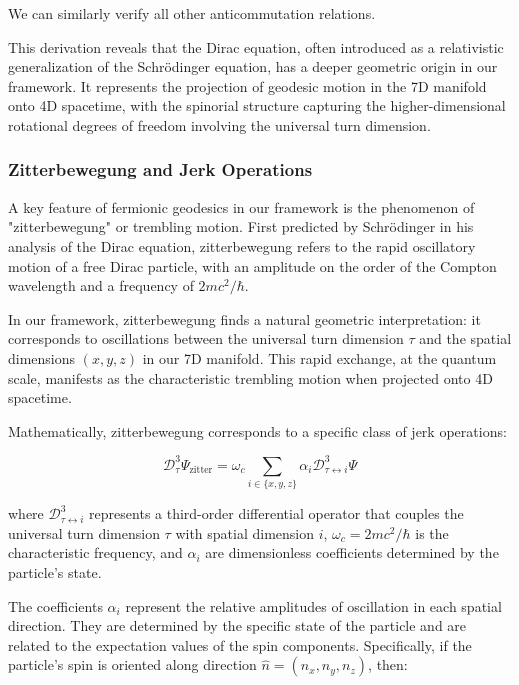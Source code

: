 \documentclass{article}
\begin{document}
We can similarly verify all other anticommutation relations.

This derivation reveals that the Dirac equation, often introduced as a relativistic generalization of the Schrödinger equation, has a deeper geometric origin in our framework. It represents the projection of geodesic motion in the 7D manifold onto 4D spacetime, with the spinorial structure capturing the higher-dimensional rotational degrees of freedom involving the universal turn dimension.

\subsubsection{Zitterbewegung and Jerk Operations}

A key feature of fermionic geodesics in our framework is the phenomenon of "zitterbewegung" or trembling motion. First predicted by Schrödinger in his analysis of the Dirac equation, zitterbewegung refers to the rapid oscillatory motion of a free Dirac particle, with an amplitude on the order of the Compton wavelength and a frequency of $2mc^2/\hbar$.

In our framework, zitterbewegung finds a natural geometric interpretation: it corresponds to oscillations between the universal turn dimension $\tau$ and the spatial dimensions $(x,y,z)$ in our 7D manifold. This rapid exchange, at the quantum scale, manifests as the characteristic trembling motion when projected onto 4D spacetime.

Mathematically, zitterbewegung corresponds to a specific class of jerk operations:

\begin{equation}
\mathcal{D}_\tau^3 \Psi_{\text{zitter}} = \omega_c \sum_{i \in \{x,y,z\}} \alpha_i \mathcal{D}_{\tau \leftrightarrow i}^3 \Psi
\end{equation}

where $\mathcal{D}_{\tau \leftrightarrow i}^3$ represents a third-order differential operator that couples the universal turn dimension $\tau$ with spatial dimension $i$, $\omega_c = 2mc^2/\hbar$ is the characteristic frequency, and $\alpha_i$ are dimensionless coefficients determined by the particle's state.

The coefficients $\alpha_i$ represent the relative amplitudes of oscillation in each spatial direction. They are determined by the specific state of the particle and are related to the expectation values of the spin components. Specifically, if the particle's spin is oriented along direction $\hat{n} = (n_x, n_y, n_z)$, then:
\end{document}
